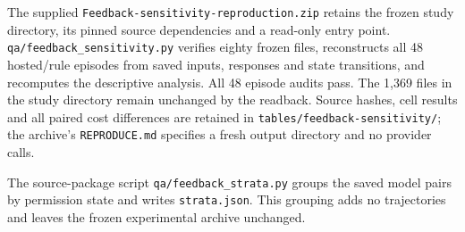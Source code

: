 The supplied \texttt{Feedback-sensitivity-reproduction.zip} retains the
frozen study directory, its pinned source dependencies and a read-only
entry point. \texttt{qa/feedback\_sensitivity.py} verifies eighty frozen
files, reconstructs all 48 hosted/rule episodes from saved inputs,
responses and state transitions, and recomputes the descriptive analysis.
All 48 episode audits pass. The 1,369 files in the study directory remain
unchanged by the readback. Source hashes, cell results and all paired cost
differences are retained in \texttt{tables/feedback-sensitivity/}; the archive's
\texttt{REPRODUCE.md} specifies a fresh output directory and no provider calls.

The source-package script \texttt{qa/feedback\_strata.py} groups the saved
model pairs by permission state and writes \texttt{strata.json}. This grouping
adds no trajectories and leaves the frozen experimental archive unchanged.
